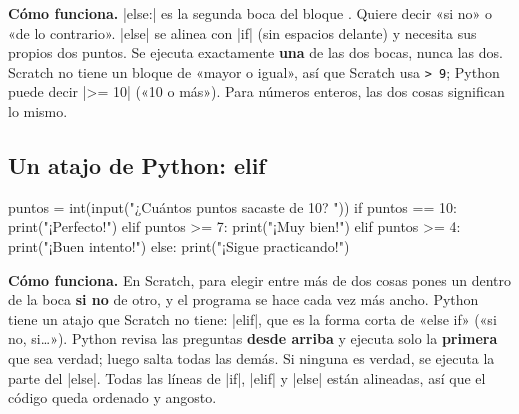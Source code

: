 \textbf{Cómo funciona.} \py|else:| es la segunda boca del bloque . Quiere decir «si no» o «de lo contrario». \py|else| se alinea con \py|if| (sin espacios delante) y necesita sus propios dos puntos. Se ejecuta exactamente \textbf{una} de las dos bocas, nunca las dos. Scratch no tiene un bloque de «mayor o igual», así que Scratch usa \texttt{> 9}; Python puede decir \py|>= 10| («10 o más»). Para números enteros, las dos cosas significan lo mismo.

\subsection*{Un atajo de Python: elif}

\begin{center}
\begin{scratch}
\end{scratch}
\end{center}
\vspace{-4pt}
\begin{code}
puntos = int(input("¿Cuántos puntos sacaste de 10? "))
if puntos == 10:
    print("¡Perfecto!")
elif puntos >= 7:
    print("¡Muy bien!")
elif puntos >= 4:
    print("¡Buen intento!")
else:
    print("¡Sigue practicando!")
\end{code}

\textbf{Cómo funciona.} En Scratch, para elegir entre más de dos cosas pones un  dentro de la boca \textbf{si no} de otro, y el programa se hace cada vez más ancho. Python tiene un atajo que Scratch no tiene: \py|elif|, que es la forma corta de «else if» («si no, si\ldots»). Python revisa las preguntas \textbf{desde arriba} y ejecuta solo la \textbf{primera} que sea verdad; luego salta todas las demás. Si ninguna es verdad, se ejecuta la parte del \py|else|. Todas las líneas de \py|if|, \py|elif| y \py|else| están alineadas, así que el código queda ordenado y angosto.

